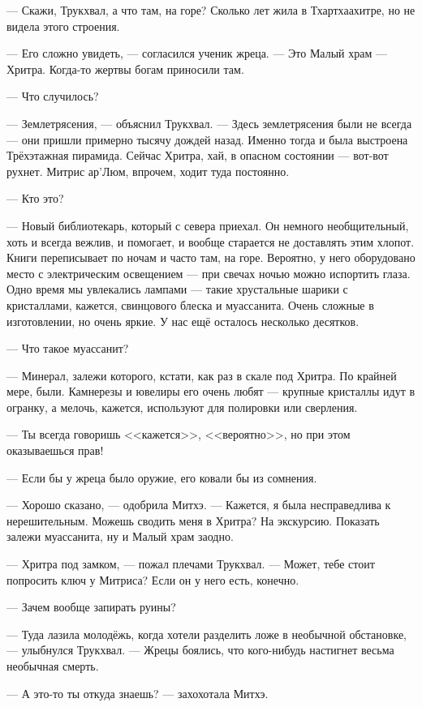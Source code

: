 --- Скажи, Трукхвал, а что там, на горе?
Сколько лет жила в Тхартхаахитре, но не видела этого строения.

--- Его сложно увидеть, --- согласился ученик жреца.
--- Это Малый храм --- Хритра.
Когда-то жертвы богам приносили там.

--- Что случилось?

--- Землетрясения, --- объяснил Трукхвал.
--- Здесь землетрясения были не всегда --- они пришли примерно тысячу дождей назад.
Именно тогда и была выстроена Трёхэтажная пирамида.
Сейчас Хритра, хай, в опасном состоянии --- вот-вот рухнет.
Митрис ар'Люм, впрочем, ходит туда постоянно.

--- Кто это?

--- Новый библиотекарь, который с севера приехал.
Он немного необщительный, хоть и всегда вежлив, и помогает, и вообще старается не доставлять этим хлопот.
Книги переписывает по ночам и часто там, на горе.
Вероятно, у него оборудовано место с электрическим освещением --- при свечах ночью можно испортить глаза.
Одно время мы увлекались лампами --- такие хрустальные шарики с кристаллами, кажется, свинцового блеска и муассанита.
Очень сложные в изготовлении, но очень яркие.
У нас ещё осталось несколько десятков.

--- Что такое муассанит?

--- Минерал, залежи которого, кстати, как раз в скале под Хритра.
По крайней мере, были.
Камнерезы и ювелиры его очень любят --- крупные кристаллы идут в огранку, а мелочь, кажется, используют для полировки или сверления.

--- Ты всегда говоришь <<кажется>>, <<вероятно>>, но при этом оказываешься прав!

--- Если бы у жреца было оружие, его ковали бы из сомнения.

--- Хорошо сказано, --- одобрила Митхэ.
--- Кажется, я была несправедлива к нерешительным.
Можешь сводить меня в Хритра?
На экскурсию.
Показать залежи муассанита, ну и Малый храм заодно.

--- Хритра под замком, --- пожал плечами Трукхвал.
--- Может, тебе стоит попросить ключ у Митриса?
Если он у него есть, конечно.

--- Зачем вообще запирать руины?

--- Туда лазила молодёжь, когда хотели разделить ложе в необычной обстановке, --- улыбнулся Трукхвал.
--- Жрецы боялись, что кого-нибудь настигнет весьма необычная смерть.

--- А это-то ты откуда знаешь? --- захохотала Митхэ.

